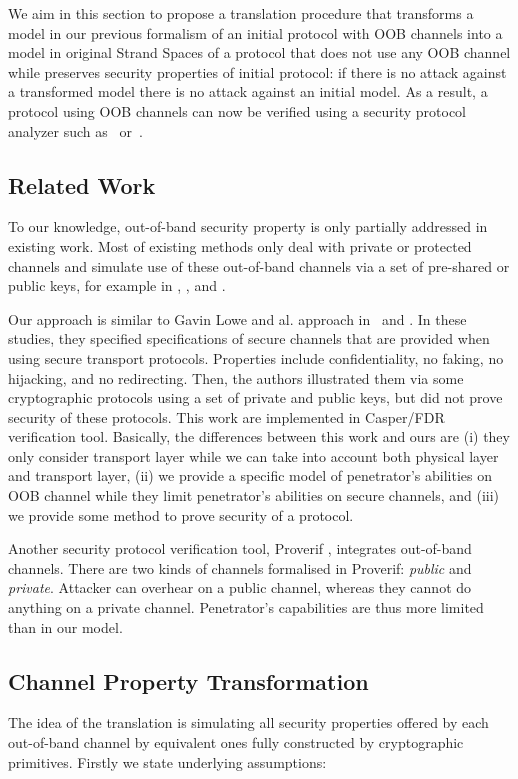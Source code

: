 We aim in this section to propose a translation procedure that transforms a model in our previous formalism of an initial protocol with OOB channels into a model in original Strand Spaces of a protocol that does not use any OOB channel while preserves security properties of initial protocol: if there is no attack against a transformed model there is no attack against an initial model. As a result, a protocol using OOB channels can now be verified using a security protocol analyzer such as~\cite{596779} or~\cite{BlanchetCSFW01}.

\subsection{Related Work}
To our knowledge, out-of-band security property is only partially addressed in existing work. Most of existing methods only deal with private or protected channels and simulate use of these out-of-band channels via a set of pre-shared or public keys, for example in \cite{Diaz2014149}, \cite{Han:2014:SPM:2627393.2627400}, and \cite{Bella:2003aa}.

Our approach is similar to Gavin Lowe and al. approach in~\cite{cdilloway2007spec} and \cite{Kamil:2011aa}. In these studies, they specified specifications of secure channels that are provided when using secure transport protocols. Properties include confidentiality, no faking, no hijacking, and no redirecting. Then, the authors illustrated them via some cryptographic protocols using a set of private and public keys, but did not prove security of these protocols. This work are implemented in Casper/FDR verification tool\cite{596779}. Basically, the differences between this work and ours are (i) they only consider transport layer while we can take into account both physical layer and transport layer, (ii) we provide a specific model of penetrator's abilities on OOB channel while they limit penetrator's abilities on secure channels, and (iii) we provide some method to prove security of a protocol.

Another security protocol verification tool, Proverif \cite{BlanchetCSFW01}, integrates out-of-band channels.
There are two kinds of channels formalised in Proverif: \emph{public} and \emph{private}. Attacker can overhear on a public channel, whereas they cannot do anything on a private channel. Penetrator's capabilities are thus more limited than in our model.

\subsection{Channel Property Transformation}\label{OOB-transform}
The idea of the translation is simulating all security properties offered by each out-of-band channel by equivalent ones fully constructed by cryptographic primitives. Firstly we state underlying assumptions:

